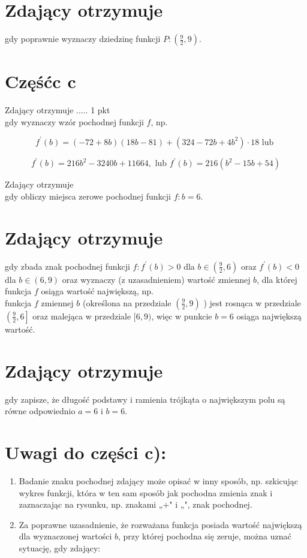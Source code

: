 \documentclass[10pt]{article}
\begin{document}
\section*{Zdający otrzymuje}
gdy poprawnie wyznaczy dziedzinę funkcji $P:\left(\frac{9}{2}, 9\right)$.

\section*{Częśćc $\mathbf{c}$}
Zdający otrzymuje ..... 1 pkt\\
gdy wyznaczy wzór pochodnej funkcji $f$, np.

$$
f^{\prime}(b)=(-72+8 b)(18 b-81)+\left(324-72 b+4 b^{2}\right) \cdot 18 \text { lub }
$$

$$
f^{\prime}(b)=216 b^{2}-3240 b+11664, \text { lub } f^{\prime}(b)=216\left(b^{2}-15 b+54\right)
$$

Zdający otrzymuje\\
gdy obliczy miejsca zerowe pochodnej funkcji $f: b=6$.

\section*{Zdający otrzymuje}
gdy zbada znak pochodnej funkcji $f: f^{\prime}(b)>0$ dla $b \in\left(\frac{9}{2}, 6\right)$ oraz $f^{\prime}(b)<0$ dla $b \in(6,9)$ oraz wyznaczy (z uzasadnieniem) wartość zmiennej $b$, dla której funkcja $f$ osiąga wartość największą, np.\\
funkcja $f$ zmiennej $b$ (określona na przedziale $\left(\frac{9}{2}, 9\right)$ ) jest rosnąca w przedziale $\left(\frac{9}{2}, 6\right]$ oraz malejąca w przedziale $[6,9)$, więc w punkcie $b=6$ osiąga największą wartość.

\section*{Zdający otrzymuje}
gdy zapisze, że długość podstawy i ramienia trójkąta o największym polu są równe odpowiednio $a=6$ i $b=6$.

\section*{Uwagi do części c):}
\begin{enumerate}
  \item Badanie znaku pochodnej zdający może opisać w inny sposób, np. szkicując wykres funkcji, która w ten sam sposób jak pochodna zmienia znak i zaznaczając na rysunku, np. znakami „+" i „", znak pochodnej.
  \item Za poprawne uzasadnienie, że rozważana funkcja posiada wartość największą dla wyznaczonej wartości $b$, przy której pochodna się zeruje, można uznać sytuację, gdy zdający:
\end{enumerate}
\end{document}
